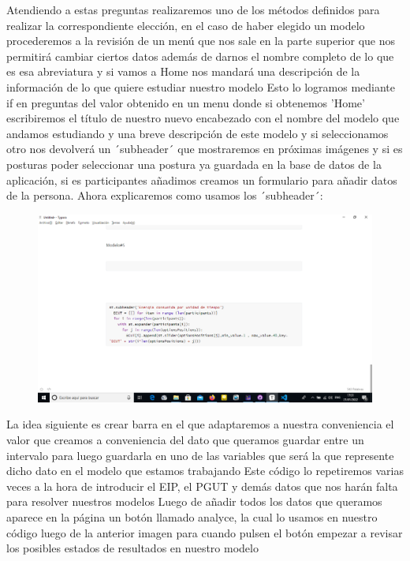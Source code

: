 \documentclass{llncs}
\begin{document}
Atendiendo a estas preguntas realizaremos uno de los métodos definidos para realizar la correspondiente elección, en el caso de haber elegido un modelo procederemos a la revisión de un menú que nos sale en la parte superior que nos permitirá cambiar ciertos datos además de darnos el nombre completo de lo que es esa abreviatura y si vamos a Home nos mandará una descripción de la información de lo que quiere estudiar nuestro modelo
\newline
\newline
Esto lo logramos mediante if en preguntas del valor obtenido en un menu donde si obtenemos 'Home' escribiremos el título de nuestro nuevo encabezado con el nombre del modelo que andamos estudiando y una breve descripción de este modelo y si seleccionamos otro nos devolverá un ´subheader´ que mostraremos en próximas imágenes y si es posturas poder seleccionar una postura ya guardada en la base de datos de la aplicación, si es participantes añadimos creamos un formulario para añadir datos de la persona.
\newline
\newline
Ahora explicaremos como usamos los ´subheader´:
\begin{figure}
	\centering
	\includegraphics[width=0.7\linewidth]{Imagenes/Codigo-Aplicacion/4}
	\label{fig:4}
\end{figure}
La idea siguiente es crear barra en el que adaptaremos a nuestra conveniencia el valor que creamos a conveniencia del dato que queramos guardar entre un intervalo para luego guardarla en uno de las variables que será la que represente dicho dato en el modelo que estamos trabajando
\newline
\newline
Este código lo repetiremos varias veces a la hora de introducir el EIP, el PGUT y demás datos que nos harán falta para resolver nuestros modelos
\newline
\newline
Luego de añadir todos los datos que queramos aparece en la página un botón llamado analyce, la cual lo usamos en nuestro código luego de la anterior imagen para cuando pulsen el botón empezar a revisar los posibles estados de resultados en nuestro modelo
\end{document}
